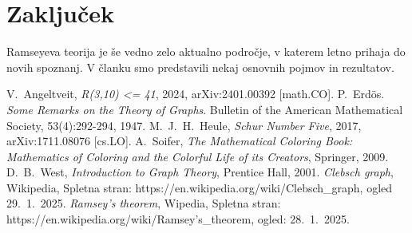 \documentclass[twoside,11pt]{article}
\begin{document}
\section{Zaključek}
\hspace{\parindent}Ramseyeva teorija je še vedno zelo aktualno področje, v 
katerem letno prihaja do novih spoznanj. 
V članku smo predstavili nekaj osnovnih pojmov in rezultatov.

\begin{thebibliography}{99}
     V.~Angeltveit, \emph{R(3,10) <= 41}, 2024, arXiv:2401.00392 [math.CO].
     P.~Erdös. \emph{Some Remarks on the Theory of Graphs}. Bulletin of the
    American Mathematical Society, 53(4):292-294, 1947.
     M.~J.~H.~Heule, \emph{Schur Number Five}, 2017, arXiv:1711.08076 [cs.LO].
     A.~Soifer, \emph{The Mathematical Coloring Book: Mathematics of Coloring and the Colorful Life of its Creators},
    Springer, 2009.
     D.~B.~West, \emph{Introduction to Graph Theory}, Prentice Hall, 2001.
     \emph{Clebsch graph}, Wikipedia, Spletna stran: https://en.wikipedia.org/wiki/Clebsch\_graph, ogled 29.~1.~2025.
     \emph{Ramsey's theorem}, Wipedia, Spletna stran: https://en.wikipedia.org/wiki/Ramsey's\_theorem, ogled: 28.~1.~2025.
\end{thebibliography}
\end{document}

